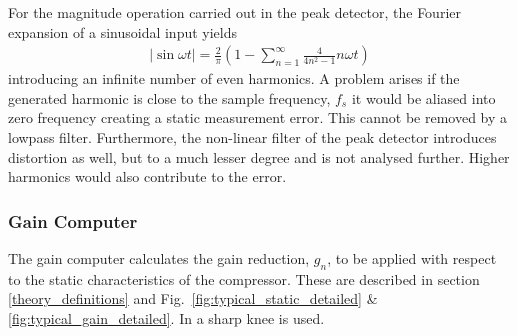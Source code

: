 \documentclass[../main2.tex]{subfiles}
\begin{document}
For the magnitude operation carried out in the peak detector, the Fourier expansion of a sinusoidal input yields
\begin{align}
\left |\sin{\omega t}\right | = \frac{2}{\pi}\left (1 - \sum_{n=1}^{\infty}\frac{4}{4n^2-1} n\omega t \right) 
\end{align}
introducing an infinite number of even harmonics. A problem arises if the generated harmonic is close to the sample frequency, $f_s$ it would be aliased into zero frequency creating a static measurement error. This cannot be removed by a lowpass filter. Furthermore, the non-linear filter of the peak detector introduces distortion as well, but to a much lesser degree\cite{mcnally1984dynamic} and is not analysed further. Higher harmonics would also contribute to the error. 
\subsubsection{Gain Computer}
The gain computer calculates the gain reduction, $g_n$, to be applied with respect to the static characteristics of the compressor. These are described in section \ref{theory_definitions} and Fig.~\ref{fig:typical_static_detailed} \& \ref{fig:typical_gain_detailed}. In \cite{mcnally1984dynamic} a sharp knee is used.
\end{document}
